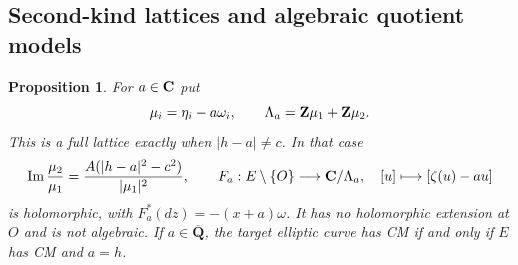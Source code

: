 \documentclass[11pt]{article}
\newtheorem{proposition}[theorem]{Proposition}
\theoremstyle{definition}\newtheorem{definition}[theorem]{Definition}
\theoremstyle{remark}\newtheorem{remark}[theorem]{Remark}
\newcommand{\Qb}{\overline{\mathbf Q}}\newcommand{\Fp}{\mathbf F_p}
\begin{document}
\subsection{Second-kind lattices and algebraic quotient models}
\begin{proposition}\label{prop:second-kind-lattice}
For $a\in\mathbf C$ put
\[
 \mu_i=\eta_i-a\omega_i,\qquad
 \Lambda_a=\mathbf Z\mu_1+\mathbf Z\mu_2.
\]
This is a full lattice exactly when $|h-a|\ne c$. In that case
\[
 \operatorname{Im}\frac{\mu_2}{\mu_1}
       =\frac{A(|h-a|^2-c^2)}{|\mu_1|^2},
 \qquad
 F_a:E\setminus\{O\}\longrightarrow\mathbf C/\Lambda_a,
 \quad[u]\longmapsto[\zeta(u)-au]
\]
is holomorphic, with $F_a^*(dz)=-(x+a)\omega$. It has no holomorphic extension at $O$ and is not algebraic. If $a\in\Qb$, the target elliptic curve has CM if and only if $E$ has CM and $a=h$.
\end{proposition}
\end{document}
